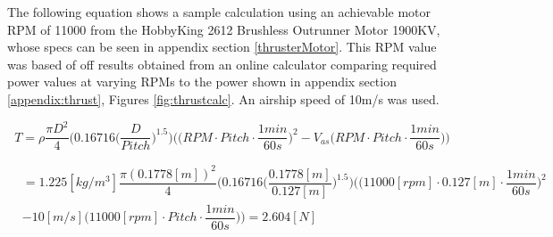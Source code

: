 \documentclass[../main.tex]{subfiles}
\begin{document}
The following equation shows a sample calculation using an achievable motor RPM of 11000 from the HobbyKing 2612 Brushless Outrunner Motor 1900KV, whose specs can be seen in appendix section \ref{thrusterMotor}. This RPM value was based of off results obtained from an online calculator comparing required power values at varying RPMs to the power shown in appendix section \ref{appendix:thrust}, Figures \ref{fig:thrustcalc}. An airship speed of 10m/s was used. 

\begin{equation}
\label{eqn:thrustfinal}
T = \rho \dfrac{\pi D^2}{4}\Bigg(0.16716\Big(\dfrac{D}{Pitch}\Big)^{1.5}\Bigg)\Bigg(\Big(RPM\cdot Pitch \cdot \dfrac{1min}{60s}\Big)^2 - V_{as}\Big(RPM\cdot Pitch \cdot \dfrac{1min}{60s}\Big)\Bigg)
\end{equation}

\begin{align*}
&= 1.225[kg/m^3] \dfrac{\pi (0.1778[m])^2}{4}\Bigg(0.16716\Big(\dfrac{0.1778[m]}{0.127[m]}\Big)^{1.5}\Bigg)\Bigg(\Big(11000[rpm]\cdot 0.127[m] \cdot \dfrac{1min}{60s}\Big)^2 \\ 
&- 10[m/s]\Big(11000[rpm]\cdot Pitch \cdot \dfrac{1min}{60s}\Big)\Bigg) = 2.604[N]
\end{align*}
\end{document}
